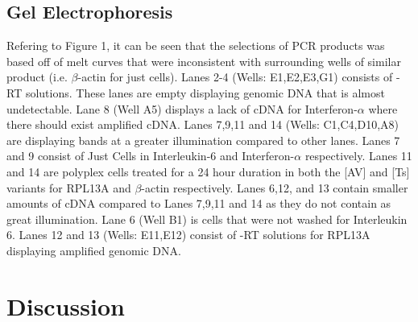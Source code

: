 \documentclass[journal, a4paper]{IEEEtran}
\begin{document}
  \subsection{Gel Electrophoresis}

    Refering to Figure 1, it can be seen that the selections of PCR products was based off of melt curves that were inconsistent with
    surrounding wells of similar product (i.e. $\beta$-actin for just cells).
    Lanes 2-4 (Wells: E1,E2,E3,G1) consists of -RT solutions. These lanes are empty displaying
    genomic DNA that is almost undetectable. Lane 8 (Well A5) displays a lack of cDNA
    for Interferon-$\alpha$ where there should exist amplified cDNA. Lanes  7,9,11 and 14
    (Wells: C1,C4,D10,A8) are displaying bands at a greater illumination compared to other lanes.
    Lanes 7 and 9 consist of Just Cells in Interleukin-6 and Interferon-$\alpha$ respectively.
    Lanes 11 and 14 are polyplex cells treated for a 24 hour duration in both the [AV] and [Ts] variants
    for RPL13A and $\beta$-actin respectively.
    Lanes 6,12, and 13 contain smaller amounts of cDNA compared to Lanes 7,9,11 and 14 as they do not contain
    as great illumination.
    Lane 6 (Well B1) is cells that were not washed for Interleukin 6.
    Lanes 12 and 13 (Wells: E11,E12) consist of -RT solutions for RPL13A displaying amplified genomic DNA.

  \section{Discussion}
\end{document}
